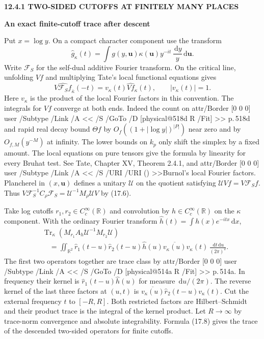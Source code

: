 \documentclass[11pt,letterpaper]{article}
\makeatletter
\newcommand{\rightmarktext}{}
\newcommand{\printfolio}{}
\newcommand{\leaf}[4]{\clearpage\gdef\printfolio{#1}\gdef\rightmarktext{#2}%
  {\small\sffamily\bfseries\color{ink}#3\par}\vspace{3pt}%
  {\LARGE\bfseries #4\par}\vspace{5pt}}
\newcommand{\R}{\mathbb R}
\newcommand{\dd}{\,\mathrm d}
\newcommand{\citetitle}[2]{\leavevmode\pdfstartlink attr{/Border [0 0 0]} user{%
 /Subtype /Link /A << /S /URI /URI (\pdfescapestring{\detokenize{#1}}) >>}{\color{ink}#2}\pdfendlink}
\DeclareMathOperator{\Tr}{Tr}
\newcommand{\MusicPDFPageRef}[1]{\pdfpageref\csname physical@#1\endcsname\space\space 0 R}
\newcommand{\pagelink}[2]{\leavevmode\pdfstartlink attr{/Border [0 0 0]} user{%
  /Subtype /Link /A << /S /GoTo /D [\MusicPDFPageRef{#1} /Fit] >>}%
  {\color{ink}#2}\pdfendlink}
\newcommand{\pg}[1]{\pagelink{#1}{p.\,#1}}
\makeatother
\begin{document}
\leaf{518e}{The descended Fourier operator}{12.4.1 \quad TWO-SIDED CUTOFFS AT FINITELY MANY PLACES}{An exact finite-cutoff trace after descent}
Put $x=\log y$. On a compact character component use the transform
\[
 \widehat g_\kappa(t)=\int g(y,\mathbf u)\kappa(\mathbf u)
                   y^{-it}\,\frac{\dd y}{y}\dd\mathbf u .
\]
Write $\mathcal F_S$ for the self-dual
additive Fourier transform. On the critical line, unfolding $Vf$ and
multiplying Tate's local functional equations gives
\[
  \widehat{V\mathcal F_S f}_{\bar\kappa}(-t)
      =v_\kappa(t)\widehat{Vf}_\kappa(t),\qquad |v_\kappa(t)|=1 .
\]
Here $v_\kappa$ is the product of the local Fourier factors in this
convention. The integrals for $Vf$ converge at both ends. Indeed the
count on \pg{518d} and rapid real decay bound $\Theta f$ by
$O_f((1+|\log y|)^{|P|})$ near zero and by $O_{f,M}(y^{-M})$ at
infinity. The lower bounds on $k_p$ only shift the simplex by a fixed
amount. The local equations on pure tensors give the formula by linearity
for every Bruhat test. See Tate, Chapter XV, Theorem 2.4.1, and
\citetitle{https://arxiv.org/abs/math/9902080}{Burnol's local Fourier factors}.
Plancherel in $(x,\mathbf u)$ defines a unitary $\mathcal U$ on the
quotient satisfying $\mathcal U Vf=V\mathcal F_S f$. Thus
$V\mathcal F_S^{-1}C_\rho\mathcal F_S
=\mathcal U^{-1}M_\rho\mathcal U V$ by (17.6).

Take log cutoffs $r_1,r_2\in C_c^\infty(\R)$ and convolution by
$h\in C_c^\infty(\R)$ on the $\kappa$ component. With the ordinary
Fourier transform $\widehat h(t)=\int h(x)e^{-itx}\dd x$,
\begin{align*}
 &\Tr_\kappa(M_{r_1}A_h\mathcal U^{-1}M_{r_2}\mathcal U)\\
 &\quad=\iint_{\R^2}\widehat r_1(t-u)\widehat r_2(t-u)\widehat h(u)
           \overline{v_\kappa(u)}v_\kappa(t)
                     \,\frac{\dd t\dd u}{(2\pi)^2}.
 \tag{17.8}
\end{align*}
The first two operators together are trace class by \pg{514a}.
In frequency their kernel is $\widehat r_1(t-u)\widehat h(u)$ for
measure $\dd u/(2\pi)$. The reverse kernel of the last three factors
at $(u,t)$ is $\overline{v_\kappa(u)}\widehat r_2(t-u)v_\kappa(t)$.
Cut the external frequency $t$ to $[-R,R]$. Both restricted factors
are Hilbert--Schmidt and their product trace is the integral of the
kernel product. Let $R\to\infty$ by trace-norm convergence and absolute
integrability. Formula (17.8) gives the trace of the descended two-sided
operators for finite cutoffs.
\end{document}
